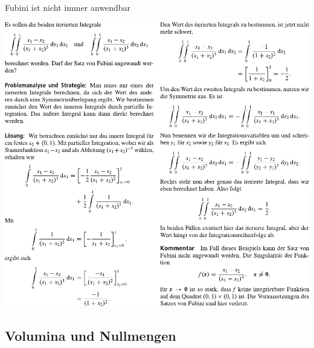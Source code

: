 \begin{Beispiel}{Fubini ist nicht immer anwendbar}
\begin{center}
    \includegraphics[width=\textwidth]{Dateien/Fubini.pdf}
\end{center}
\end{Beispiel}
\newpage
\subsection{Volumina und Nullmengen}

